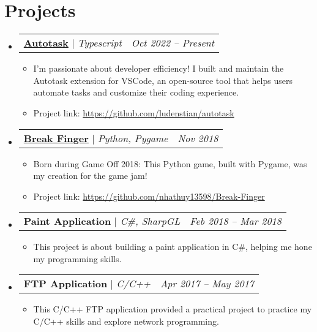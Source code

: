 \documentclass[letterpaper,1pt]{article}
\makeatletter
\newcommand{\subheadingtitlevspace}{
\vspace{-3pt}
}
\newcommand{\resumeItem}[1]{
  \item\large{
    {#1 \vspace{-4pt}}
  }
}
\newcommand{\titleItem}[1]{
  \large\textbf{#1}
}
\newcommand{\resumeProjectHeading}[2]{
    \item
    \begin{tabular*}{0.97\textwidth}{l@{\extracolsep{\fill}}r}
      #1 & \textit{\large #2} \\
    \end{tabular*}\vspace{-9pt}
}
\newcommand{\resumeSubHeadingListStart}{\subheadingtitlevspace\begin{itemize}[leftmargin=0.15in, label={}]}
\newcommand{\resumeSubHeadingListEnd}{\end{itemize}}
\newcommand{\resumeItemListStart}{
\begin{itemize}}
\newcommand{\resumeItemListEnd}{
\end{itemize}\vspace{-8pt}}
\makeatother
\begin{document}

 \section{Projects}    
     \resumeSubHeadingListStart
        \resumeProjectHeading
           {\titleItem{\href{https://github.com/ludenstian/autotask}{Autotask}} $|$ \emph{Typescript}}{Oct 2022 -- Present}
            \resumeItemListStart
            \resumeItem{I'm passionate about developer efficiency! I built and maintain the Autotask extension for VSCode, an open-source tool that helps users automate tasks and customize their coding experience.}
            \resumeItem{Project link: \href{https://github.com/ludenstian/autotask}{https://github.com/ludenstian/autotask}}
           \resumeItemListEnd
       \resumeProjectHeading
           {\titleItem{\href{https://nhathuy13598.itch.io/break-finger}{Break Finger}} $|$ \emph{Python, Pygame}}{Nov 2018}
            \resumeItemListStart
            \resumeItem{Born during Game Off 2018: This Python game, built with Pygame, was my creation for the game jam!} 
            \resumeItem{Project link: \href{https://github.com/nhathuy13598/Break-Finger}{https://github.com/nhathuy13598/Break-Finger}}
           \resumeItemListEnd
       \resumeProjectHeading
           {\titleItem{Paint Application} $|$ \emph{C\#, SharpGL}}{Feb 2018 -- Mar 2018}
            \resumeItemListStart
            \resumeItem{This project is about building a paint application in C\#, helping me hone my programming skills.}
           \resumeItemListEnd
        \resumeProjectHeading
           {\titleItem{FTP Application} $|$ \emph{C/C++}}{Apr 2017 -- May 2017}
            \resumeItemListStart
            \resumeItem{This C/C++ FTP application provided a practical project to practice my C/C++ skills and explore network programming.}
           \resumeItemListEnd
     \resumeSubHeadingListEnd

\end{document}

